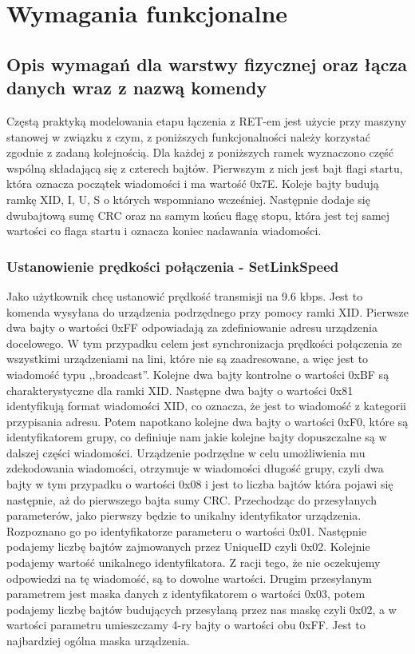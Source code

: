 \chapter{Wymagania funkcjonalne}
	\section{Opis wymagań dla warstwy fizycznej oraz łącza danych wraz z nazwą komendy}
		Częstą praktyką modelowania etapu łączenia z RET-em jest użycie przy maszyny stanowej w związku z czym, z poniższych funkcjonalności należy korzystać zgodnie z zadaną kolejnością.
		Dla każdej z poniższych ramek wyznaczono część wspólną składającą się z czterech bajtów. Pierwszym z nich jest bajt flagi startu, która oznacza początek wiadomości i ma wartość 0x7E.
		Koleje bajty budują ramkę XID, I, U, S o których wspomniano wcześniej. Następnie dodaje się dwubajtową sumę CRC oraz na samym końcu flagę stopu, która jest tej samej wartości co flaga startu i oznacza koniec nadawania wiadomości.
		\subsection{Ustanowienie prędkości połączenia - SetLinkSpeed}
			Jako użytkownik chcę ustanowić prędkość transmisji na 9.6 kbps.
			\newline\newline
			Jest to komenda wysyłana do urządzenia podrzędnego przy pomocy ramki XID.
			\newline
			Pierwsze dwa bajty o wartości 0xFF odpowiadają za zdefiniowanie adresu urządzenia docelowego. 
			W tym przypadku celem jest synchronizacja prędkości połączenia ze wszystkimi urządzeniami na lini, które nie są zaadresowane, a więc jest to wiadomość typu ,,broadcast''.
			\newline
			Kolejne dwa bajty kontrolne o wartości 0xBF są charakterystyczne dla ramki XID.
			\newline
			Następne dwa bajty o wartości 0x81 identyfikują format wiadomości XID, co oznacza, że jest to wiadomość z kategorii przypisania adresu.
			\newline
			Potem napotkano kolejne dwa bajty o wartości 0xF0, które są identyfikatorem grupy, co definiuje nam jakie kolejne bajty dopuszczalne są w dalszej części wiadomości.
			\newline
			Urządzenie podrzędne w celu umożliwienia mu zdekodowania wiadomości, otrzymuje w wiadomości długość grupy, czyli dwa bajty w tym przypadku o wartości 0x08 i jest to 
			liczba bajtów która pojawi się następnie, aż do pierwszego bajta sumy CRC.
			\newline
			Przechodząc do przesyłanych parameterów, jako pierwszy będzie to unikalny identyfikator urządzenia. Rozpoznano go po identyfikatorze parameteru o wartości 0x01.
			Następnie podajemy liczbę bajtów zajmowanych przez UniqueID czyli 0x02. Kolejnie podajemy wartość unikalnego identyfikatora. Z racji tego, że nie oczekujemy odpowiedzi
			na tę wiadomość, są to dowolne wartości.
			Drugim przesyłanym parametrem jest maska danych z identyfikatorem o wartości 0x03, potem podajemy liczbę bajtów budujących przesyłaną przez nas maskę czyli 0x02, a w wartości 
			parametru umieszczamy 4-ry bajty o wartości obu 0xFF. Jest to najbardziej ogólna maska urządzenia.
